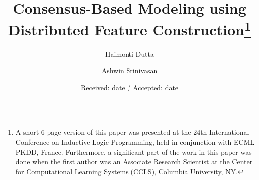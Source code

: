 \title{Consensus-Based Modeling using Distributed Feature Construction\thanks{A short 6-page version of this paper was presented at the 24th International Conference on Inductive Logic Programming, held in conjunction with ECML PKDD, France. Furthermore, a significant part of the work in this paper was done when the first author was an Associate Research Scientist at the Center for Computational Learning Systems (CCLS), Columbia University, NY.}}
 \subtitle{}


\author{Haimonti Dutta \and Ashwin Srinivasan}





\date{Received: date / Accepted: date}


\maketitle

